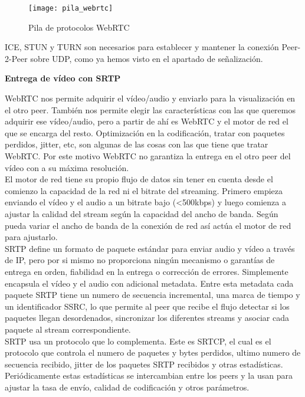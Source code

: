 \begin{figure}[htb]
\centering
\texttt{[image: pila\_webrtc]}
\caption{Pila de protocolos WebRTC}
\label{fig:pila_webrtc}
\end{figure}


ICE, STUN y TURN son necesarios para establecer y mantener la conexión Peer-2-Peer sobre UDP, como ya hemos visto en el apartado de señalización.\\

\begin{normalsize}
\noindent \textbf{Entrega de vídeo con SRTP}\\
\end{normalsize}

WebRTC nos permite adquirir el vídeo/audio y enviarlo para la visualización en el otro peer. También nos permite elegir las características con las que queremos adquirir ese vídeo/audio, pero a partir de ahí es WebRTC y el motor de red el que se encarga del resto. Optimización en la codificación, tratar con paquetes perdidos, jitter, etc, son algunas de las cosas con las que tiene que tratar WebRTC. Por este motivo WebRTC no garantiza la entrega en el otro peer del vídeo con a su máxima resolución.\\

El motor de red tiene su propio flujo de datos sin tener en cuenta desde el comienzo la capacidad de la red ni el bitrate del streaming. Primero empieza enviando el vídeo y el audio a un bitrate bajo (<500kbps) y luego comienza a ajustar la calidad del stream según la capacidad del ancho de banda. Según pueda variar el ancho de banda de la conexión de red así actúa el motor de red para ajustarlo.\\

SRTP define un formato de paquete estándar para enviar audio y vídeo a través de IP, pero por si mismo no proporciona ningún mecanismo o garantías de entrega en orden, fiabilidad en la entrega o corrección de errores. Simplemente encapsula el vídeo y el audio con adicional metadata. Entre esta metadata cada paquete SRTP tiene un numero de secuencia incremental, una marca de tiempo y un identificador SSRC, lo que permite al peer que recibe el flujo detectar si los paquetes llegan desordenados, sincronizar los diferentes streams y asociar cada paquete al stream correspondiente.\\

SRTP usa un protocolo que lo complementa. Este es SRTCP, el cual es el protocolo que controla el numero de paquetes y bytes perdidos, ultimo numero de secuencia recibido, jitter de los paquetes SRTP recibidos y otras estadísticas. Periódicamente estas estadísticas se intercambian entre los peers y la usan para ajustar la tasa de envío, calidad de codificación y otros parámetros.\\

